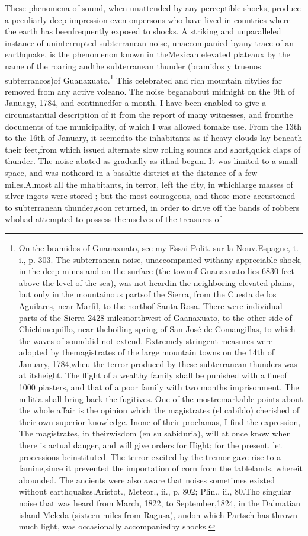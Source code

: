 These phenomena of sound, when unattended by any perceptible shocks, produce a peculiarly deep impression even onpersons who have lived in countries where the earth has beenfrequently exposed to shocks. A striking and unparalleled instance of uninterrupted subterranean noise, unaccompanied byany trace of an earthquake, is the phenomenon known in theMexican elevated plateaux by the name of the  roaring andthe subterranean thunder (bramidos y truenos subterrancos)of Guanaxuato.\footnote{On the bramidos of Guanaxuato, see my Essai Polit. sur la Nouv.Espagne, t. i., p. 303. The subterranean noise, unaccompanied withany appreciable shock, in the deep mines and on the surface (the townof Guanaxuato lies 6830 feet above the level of the sea), was not heardin the neighboring elevated plains, but only in the mountainous partsof the Sierra, from the Cuesta de los Aguilares, near Marfil, to the northof Santa Rosa. There were individual parts of the Sierra 2428 milesnorthwest of Gaanaxuato, to the other side of Chichimequillo, near theboiling spring of San Jos\'{e} de Comangillas, to which the waves of sounddid not extend. Extremely stringent measures were adopted by themagistrates of the large mountain towns on the 14th of January, 1784,wheu the terror produced by these subterranean thunders was at itsheight. The flight of a wealthy family shall be punished with a fineof 1000 piasters, and that of a poor family with two months imprisonment. The militia shall bring back the fugitives. One of the mostremarkable points about the whole affair is the opinion which the magistrates (el cabildo) cherished of their own superior knowledge. Inone of their proclamas, I find the expression,  The magistrates, in theirwisdom (en su sabiduria), will at once know when there is actual danger, and will give orders for Hight; for the present, let processions beinstituted. The terror excited by the tremor gave rise to a famine,since it prevented the importation of corn from the tablelands, whereit abounded. The ancients were also aware that noises sometimes existed without earthquakes.Aristot., Meteor., ii., p. 802; Plin., ii., 80.Tho singular noise that was heard from March, 1822, to September,1824, in the Dalmatian island Meleda (sixteen miles from Ragusa), andon which Partsch has thrown much light, was occasionally accompaniedby shocks.} This celebrated and rich mountain citylies far removed from any active voleano. The noise beganabout midnight on the 9th of Januagy, 1784, and continuedfor a month. I have been enabled to give a circumstantial description of it from the report of many witnesses, and fromthe documents of the municipality, of which I was allowed tomake use. From the 13th to the 16th of January, it seemedto the inhabitants as if heavy clouds lay beneath their feet,from which issued alternate slow rolling sounds and short,quick claps of thunder. The noise abated as gradually as ithad begun. It was limited to a small space, and was notheard in a basaltic district at the distance of a few miles.Almost all the mhabitants, in terror, left the city, in whichlarge masses of silver ingots were stored ; but the most courageous, and those more accustomed to subterranean thunder,soon returned, in order to drive off the bands of robbers whohad attempted to possess themselves of the treasures of 